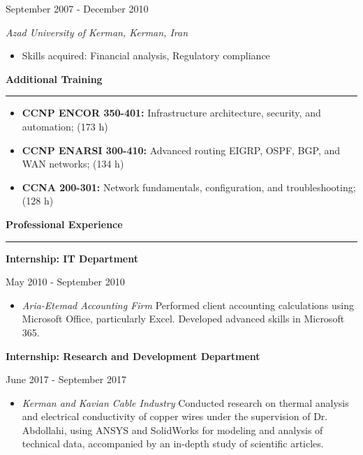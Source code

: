 \documentclass[a4paper]{letter}
\newcommand{\divider}{\rule{\linewidth}{0.9pt}}
\begin{document}
\begin{minipage}[t]{0.67\textwidth}
{\footnotesize September 2007 - December 2010}

{\textit{Azad University of Kerman, Kerman, Iran}}

\vspace{1mm}
\begin{itemize}
    \footnotesize
    \item Skills acquired: Financial analysis, Regulatory compliance
\end{itemize}
\vspace{3mm}


{\large \textbf{Additional Training}}
\divider
\vspace{4mm}
\begin{itemize}
    \footnotesize \item {\textbf{CCNP ENCOR 350-401:} Infrastructure architecture, security, and automation; (173 h)}
    \vspace{2mm}
    \footnotesize \item {\textbf{CCNP ENARSI 300-410:} Advanced routing EIGRP, OSPF, BGP, and WAN networks; (134 h)}
    \vspace{2mm}
    \footnotesize \item {\textbf{CCNA 200-301:} Network fundamentals, configuration, and troubleshooting; (128 h)}
\end{itemize}
\vspace{3mm}



{\large \textbf{Professional Experience}}
\divider

\vspace{1mm}
{\textbf{Internship: IT Department}}

{\footnotesize May 2010 - September 2010}
\begin{itemize}
    \footnotesize \item \textit{Aria-Etemad Accounting Firm}
   \newline
    Performed client accounting calculations using Microsoft Office, particularly Excel. Developed advanced skills in Microsoft 365.
\end{itemize}

\vspace{3mm}
{\textbf{Internship: Research and Development Department}}

{\footnotesize June 2017 - September 2017}
\begin{itemize}
    \footnotesize \item \textit{Kerman and Kavian Cable Industry}
   \newline
   Conducted research on thermal analysis and electrical conductivity of copper wires under the supervision of Dr. Abdollahi, using ANSYS and SolidWorks for modeling and analysis of technical data, accompanied by an in-depth study of scientific articles.
\end{itemize}


\end{minipage}
\end{document}
